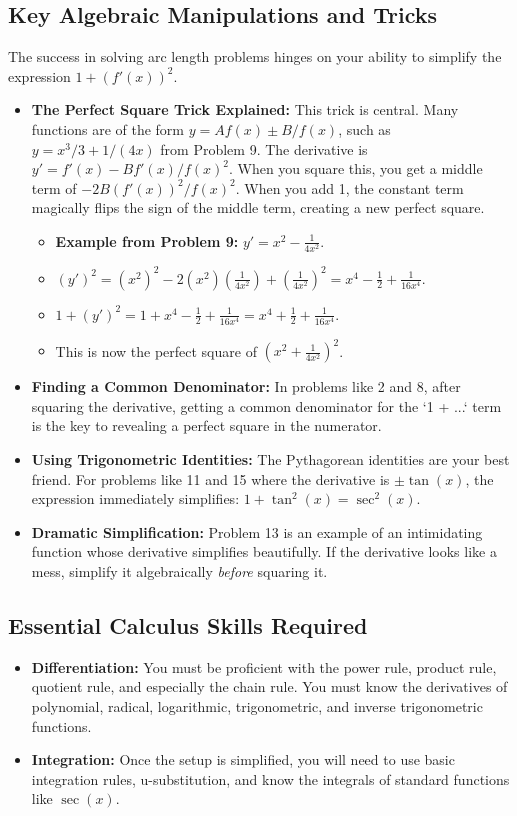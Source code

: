 \documentclass{article}
\begin{document}
\subsection{Key Algebraic Manipulations and Tricks}
The success in solving arc length problems hinges on your ability to simplify the expression $ 1 + (f'(x))^2 $.
\begin{itemize}
    \item \textbf{The Perfect Square Trick Explained:} This trick is central. Many functions are of the form $ y = A f(x) \pm B/f(x) $, such as $ y = x^3/3 + 1/(4x) $ from Problem 9. The derivative is $ y' = f'(x) - B f'(x)/f(x)^2 $. When you square this, you get a middle term of $ -2B(f'(x))^2/f(x)^2 $. When you add 1, the constant term magically flips the sign of the middle term, creating a new perfect square.
        \begin{itemize}
            \item \textbf{Example from Problem 9:} $ y' = x^2 - \frac{1}{4x^2} $.
            \item $(y')^2 = (x^2)^2 - 2(x^2)(\frac{1}{4x^2}) + (\frac{1}{4x^2})^2 = x^4 - \frac{1}{2} + \frac{1}{16x^4} $.
            \item $1+(y')^2 = 1 + x^4 - \frac{1}{2} + \frac{1}{16x^4} = x^4 + \frac{1}{2} + \frac{1}{16x^4} $.
            \item This is now the perfect square of $ (x^2 + \frac{1}{4x^2})^2 $.
        \end{itemize}
    \item \textbf{Finding a Common Denominator:} In problems like 2 and 8, after squaring the derivative, getting a common denominator for the `1 + ...` term is the key to revealing a perfect square in the numerator.
    \item \textbf{Using Trigonometric Identities:} The Pythagorean identities are your best friend. For problems like 11 and 15 where the derivative is $ \pm\tan(x) $, the expression immediately simplifies: $ 1 + \tan^2(x) = \sec^2(x) $.
    \item \textbf{Dramatic Simplification:} Problem 13 is an example of an intimidating function whose derivative simplifies beautifully. If the derivative looks like a mess, simplify it algebraically \textit{before} squaring it.
\end{itemize}

\subsection{Essential Calculus Skills Required}
\begin{itemize}
    \item \textbf{Differentiation:} You must be proficient with the power rule, product rule, quotient rule, and especially the chain rule. You must know the derivatives of polynomial, radical, logarithmic, trigonometric, and inverse trigonometric functions.
    \item \textbf{Integration:} Once the setup is simplified, you will need to use basic integration rules, u-substitution, and know the integrals of standard functions like $ \sec(x) $.
\end{itemize}
\end{document}
